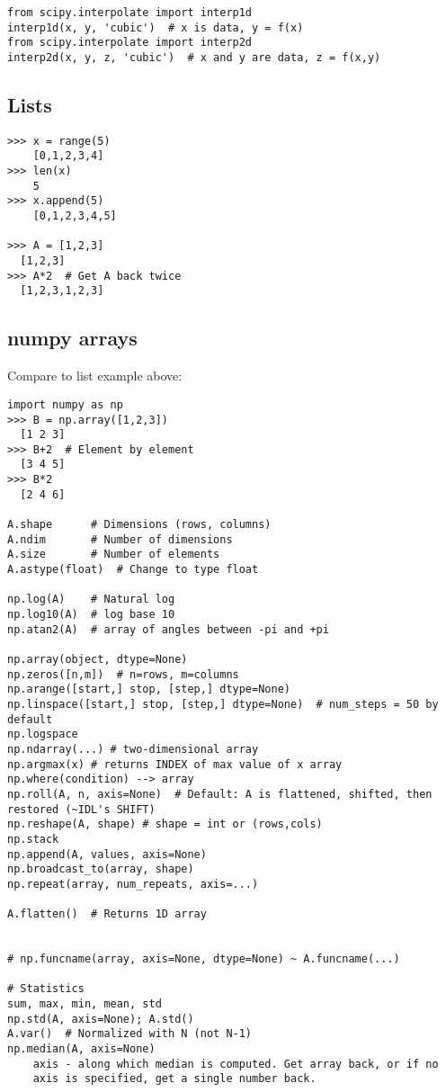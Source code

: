 \documentclass{article}
\begin{document}
\begin{multicols}{2}
\begin{lstlisting}
from scipy.interpolate import interp1d
interp1d(x, y, 'cubic')  # x is data, y = f(x)
from scipy.interpolate import interp2d
interp2d(x, y, z, 'cubic')  # x and y are data, z = f(x,y)
\end{lstlisting}

\newpage
\subsection{Lists}
\begin{lstlisting}
>>> x = range(5)
    [0,1,2,3,4]
>>> len(x)
    5
>>> x.append(5)
    [0,1,2,3,4,5]

>>> A = [1,2,3]
  [1,2,3]
>>> A*2  # Get A back twice
  [1,2,3,1,2,3]
\end{lstlisting}

\subsection{numpy arrays}
Compare to list example above:
\begin{lstlisting}
import numpy as np
>>> B = np.array([1,2,3])
  [1 2 3]
>>> B+2  # Element by element
  [3 4 5]
>>> B*2
  [2 4 6]

A.shape      # Dimensions (rows, columns)
A.ndim       # Number of dimensions
A.size       # Number of elements
A.astype(float)  # Change to type float

np.log(A)    # Natural log
np.log10(A)  # log base 10
np.atan2(A)  # array of angles between -pi and +pi

np.array(object, dtype=None)
np.zeros([n,m])  # n=rows, m=columns
np.arange([start,] stop, [step,] dtype=None)
np.linspace([start,] stop, [step,] dtype=None)  # num_steps = 50 by default
np.logspace
np.ndarray(...) # two-dimensional array
np.argmax(x) # returns INDEX of max value of x array
np.where(condition) --> array
np.roll(A, n, axis=None)  # Default: A is flattened, shifted, then restored (~IDL's SHIFT)
np.reshape(A, shape) # shape = int or (rows,cols)
np.stack
np.append(A, values, axis=None)
np.broadcast_to(array, shape)
np.repeat(array, num_repeats, axis=...)

A.flatten()  # Returns 1D array


# np.funcname(array, axis=None, dtype=None) ~ A.funcname(...)

# Statistics
sum, max, min, mean, std
np.std(A, axis=None); A.std()
A.var()  # Normalized with N (not N-1)
np.median(A, axis=None)
    axis - along which median is computed. Get array back, or if no
    axis is specified, get a single number back.


\end{lstlisting}
\end{multicols}
\end{document}
